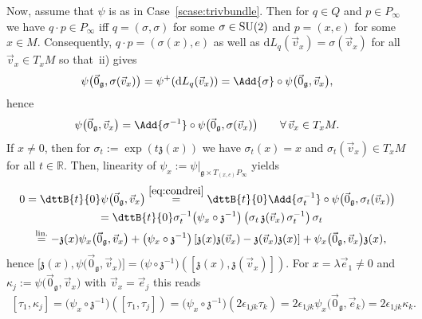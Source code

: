 \documentclass[pdftex]{sigma}
\numberwithin{equation}{section}
\begin{document}
Now, assume that $\psi$ is as in Case~\ref{scase:trivbundle}.
Then for $q\in Q$ and $p\in P_\infty$ we have $q\cdot p\in P_\infty$ if\/f $q=(\sigma,\sigma)$ for some $\sigma\in {\rm SU}(2)$
and $p=(x,e)$ for some $x\in M$.
Consequently, $q\cdot p=(\sigma(x),e)$ as well as $\mathrm{d} L_q(\vec{v}_x)=\sigma(\vec{v}_x)$ for all $\vec{v}_x\in
T_xM$ so that~ii) gives
\begin{gather*}
\psi\big(\vec{0}_{\mathfrak{g}},\sigma(\vec{v}_x)\big)=\psi^+(\mathrm{d} L_q(\vec{v}_x))=\Add{\sigma}\circ
\psi\big(\vec{0}_{\mathfrak{g}},\vec{v}_x\big),
\end{gather*}
hence
\begin{gather}
\label{eq:condrei}
\psi\big(\vec{0}_{\mathfrak{g}},\vec{v}_x\big)=\Add{\sigma^{-1}}\circ
\psi\big(\vec{0}_{\mathfrak{g}},\sigma(\vec{v}_x)\big)
\qquad\forall\, \vec{v}_x\in T_xM.
\end{gather}
If $x\neq 0$, then for $\sigma_t:=\exp(t{\mathfrak{z}}(x))$ we have $\sigma_t(x)=x$ and $\sigma_t(\vec{v}_x)\in T_x M$
for all $t\in \mathbb{R}$.
Then, linearity of $\psi_x:=\psi|_{\mathfrak{g}\times T_{(x,e)}P_\infty}$ yields \begin{gather*}
0=\dttB{t}{0}\psi\big(\vec{0}_{\mathfrak{g}},\vec{v}_x\big)
\stackrel{\eqref{eq:condrei}}{=}\dttB{t}{0}\Add{\sigma_t^{-1}}\circ
\psi\big(\vec{0}_{\mathfrak{g}},\sigma_t(\vec{v}_x)\big)
\\
\phantom{0}=\dttB{t}{0}\sigma^{-1}_t \big(\psi_x\circ {\mathfrak{z}}^{-1}\big)\left(\sigma_t\,{\mathfrak{z}}(\vec{v}_x)\,\sigma^{-1}_t\right)
\sigma_t
\\
\phantom{0}\hspace*{-0.5mm}\stackrel{\text{lin.}}{=}-{\mathfrak{z}}(x) \psi_x\big(\vec{0}_{\mathfrak{g}},\vec{v}_x\big)+ \big(\psi_x\circ
{\mathfrak{z}}^{-1}\big)\left[{\mathfrak{z}}(x){\mathfrak{z}}(\vec{v}_x)-{\mathfrak{z}}(\vec{v}_x){\mathfrak{z}}(x)\right]
+\psi_x\big(\vec{0}_{\mathfrak{g}},\vec{v}_x\big){\mathfrak{z}}(x),
\end{gather*}
hence $\big[{\mathfrak{z}}(x),\psi\big(\vec{0}_{\mathfrak{g}},\vec{v}_x\big)\big]=\big(\psi\circ
{\mathfrak{z}}^{-1}\big)\left([{\mathfrak{z}}(x),{\mathfrak{z}}(\vec{v}_x)]\right)$.
For $x=\lambda \vec{e}_1\neq 0$ and $\kappa_j:=\psi\big(\vec{0}_{\mathfrak{g}},\vec{v}_x\big)$ with
$\vec{v}_x=\vec{e}_j$ this reads
\begin{gather*}
\left[\tau_1,\kappa_j
\right]=\big(\psi_x\circ{\mathfrak{z}}^{-1}\big)([\tau_1,\tau_j])=\big(\psi_x\circ{\mathfrak{z}}^{-1}\big)(2\epsilon_{1jk}\tau_k)
=2\epsilon_{1jk}\psi_x\big(\vec{0}_{\mathfrak{g}},\vec{e}_k\big)=2\epsilon_{1jk}\kappa_k.
\end{gather*}
\end{document}
